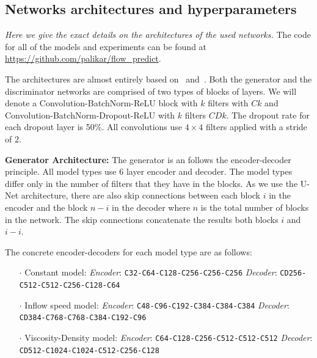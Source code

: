\documentclass{llncs}
\begin{document}
\begin{subappendices}
\renewcommand{\thesection}{\Alph{section}}%

\section{Networks architectures and hyperparameters}\label{app1}
\emph{Here we give the exact details on the architectures of the used networks.} The code for all of the models and experiments can be found at \url{https://github.com/palikar/flow_predict}.

The architectures are almost entirely based on~\cite{pix2pix} and~\cite{radford2015}. Both the generator and the discriminator networks are comprised of two types of blocks of layers. We will denote a Convolution-BatchNorm-ReLU block with $k$ filters with $Ck$ and Convolution-BatchNorm-Dropout-ReLU with $k$ filters $CDk$. The dropout rate for each dropout layer is 50\%. All convolutions use $4\times4$ filters applied with a stride of $2$.

\noindent\textbf{Generator Architecture:}
The generator is an follows the encoder-decoder principle. All model types use 6 layer encoder and decoder. The model types differ only in the number of filters that they have in the blocks. As we use the U-Net architecture, there are also skip connections between each block $i$ in the encoder and the block $n-i$ in the decoder where $n$ is the total number of blocks in the network. The skip connections concatenate the results both blocks $i$ and $i-i$.

The concrete encoder-decoders for each model type are as follows:
\begin{itemize}
\item[$\cdot$] Constant model:\newline
  \emph{Encoder}: \texttt{C32-C64-C128-C256-C256-C256}\newline
  \emph{Decoder}: \texttt{CD256-C512-C512-C256-C128-C64}
\item[$\cdot$] Inflow speed model:\newline
  \emph{Encoder}: \texttt{C48-C96-C192-C384-C384-C384}\newline
  \emph{Decoder}: \texttt{CD384-C768-C768-C384-C192-C96}
\item[$\cdot$] Viscosity-Density model:\newline
  \emph{Encoder}: \texttt{C64-C128-C256-C512-C512-C512} \newline
  \emph{Decoder}: \texttt{CD512-C1024-C1024-C512-C256-C128}
\end{itemize}


\end{subappendices}
\end{document}
